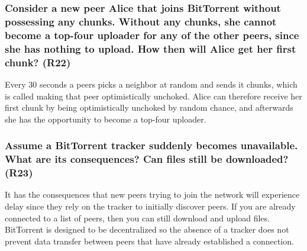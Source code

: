 \subsubsection{Consider a new peer Alice that joins BitTorrent without possessing any chunks. Without any chunks, she cannot become a top-four uploader for any of the other peers, since she has nothing to upload. How then will Alice get her first chunk? (R22)}

Every 30 seconds a peers picks a neighbor at random and sends it chunks, which is called making that peer optimistically unchoked. Alice can therefore receive her first chunk by being optimistically unchoked by random chance, and afterwards she has the opportunity to become a top-four uploader.


\subsubsection{Assume a BitTorrent tracker suddenly becomes unavailable. What are its consequences? Can files still be downloaded? (R23)}

It has the consequences that new peers trying to join the network will experience delay since they rely on the tracker to initially discover peers. If you are already connected to a list of peers, then you can still download and upload files. BitTorrent is designed to be decentralized so the absence of a tracker does not prevent data transfer between peers that have already established a connection.

